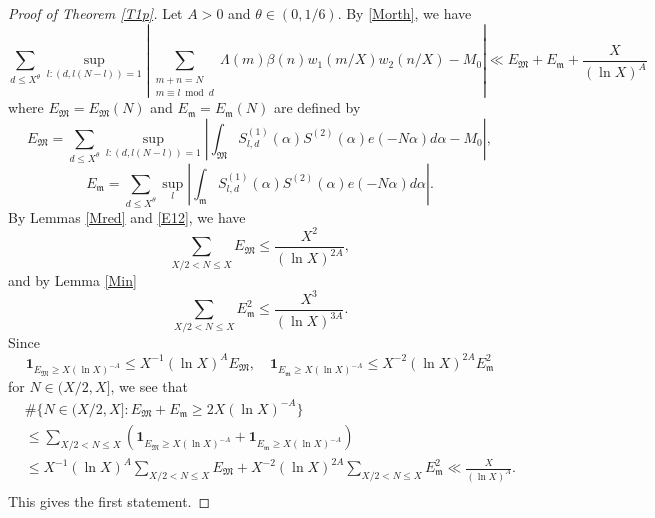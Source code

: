 \documentclass{amsart}
\theoremstyle{definition}
\theoremstyle{remark}
\newcommand{\1}{
    \bm{1}
}
\begin{document}
\begin{proof}[Proof of Theorem \ref{T1p}]
Let $A>0$ and $\theta \in (0,1/6)$. By \eqref{Morth}, we have
\[ \sum_{d \leq X^{\theta}} \sup_{l:(d,l(N-l))=1} \left| \sum_{\substack{m+n=N \\ m \equiv l \bmod d}} \Lambda(m) \beta(n) w_1(m/X) w_2(n/X) - M_0 \right| \ll E_{\mathfrak{M}} + E_{\mathfrak{m}} + \frac{X}{(\ln{X})^A} \]
where $E_{\mathfrak{M}}=E_{\mathfrak{M}}(N)$ and $E_{\mathfrak{m}}=E_{\mathfrak{m}}(N)$ are defined by
\[ E_{\mathfrak{M}} = \sum_{d \leq X^{\theta}} \sup_{l:(d,l(N-l))=1} \left| \int_{\mathfrak{M}} S^{(1)}_{l,d}(\alpha) S^{(2)}(\alpha) e(-N\alpha) d\alpha - M_0 \right|, \]
\[ E_{\mathfrak{m}} = \sum_{d \leq X^{\theta}} \sup_{l} \left| \int_{\mathfrak{m}} S^{(1)}_{l,d}(\alpha) S^{(2)}(\alpha) e(-N\alpha) d\alpha \right|. \]
By Lemmas \ref{Mred} and \ref{E12}, we have
\[ \sum_{X/2<N\leq X} E_{\mathfrak{M}} \leq \frac{X^2}{(\ln{X})^{2A}}, \]
and by Lemma \ref{Min}
\[ \sum_{X/2<N\leq X} E^2_{\mathfrak{m}} \leq \frac{X^3}{(\ln{X})^{3A}}. \]
Since
\[ \1_{E_{\mathfrak{M}} \geq X(\ln{X})^{-A}} \leq X^{-1} (\ln{X})^{A} E_{\mathfrak{M}}, \quad \1_{E_{\mathfrak{m}} \geq X(\ln{X})^{-A}} \leq X^{-2} (\ln{X})^{2A} E^2_{\mathfrak{m}} \]
for $N \in (X/2,X]$, we see that
\begin{align*}
&\#\{ N \in (X/2,X] : E_{\mathfrak{M}} + E_{\mathfrak{m}} \geq 2X(\ln{X})^{-A} \} \\
&\leq \sum_{X/2<N \leq X} (\1_{E_{\mathfrak{M}} \geq X(\ln{X})^{-A}}+\1_{E_{\mathfrak{m}} \geq X(\ln{X})^{-A}}) \\
&\leq X^{-1} (\ln{X})^{A} \sum_{X/2<N \leq X} E_{\mathfrak{M}} + X^{-2} (\ln{X})^{2A} \sum_{X/2<N \leq X} E^2_{\mathfrak{m}} \ll \frac{X}{(\ln{X})^A}. \\
\end{align*}
This gives the first statement. 


\end{proof}
\end{document}
